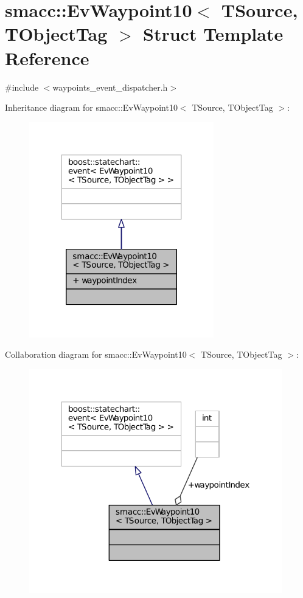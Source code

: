 \hypertarget{structsmacc_1_1EvWaypoint10}{}\section{smacc\+:\+:Ev\+Waypoint10$<$ T\+Source, T\+Object\+Tag $>$ Struct Template Reference}
\label{structsmacc_1_1EvWaypoint10}


{\ttfamily \#include $<$waypoints\+\_\+event\+\_\+dispatcher.\+h$>$}



Inheritance diagram for smacc\+:\+:Ev\+Waypoint10$<$ T\+Source, T\+Object\+Tag $>$\+:
\nopagebreak
\begin{figure}[H]
\begin{center}
\leavevmode
\includegraphics[width=227pt]{structsmacc_1_1EvWaypoint10__inherit__graph}
\end{center}
\end{figure}


Collaboration diagram for smacc\+:\+:Ev\+Waypoint10$<$ T\+Source, T\+Object\+Tag $>$\+:
\nopagebreak
\begin{figure}[H]
\begin{center}
\leavevmode
\includegraphics[width=312pt]{structsmacc_1_1EvWaypoint10__coll__graph}
\end{center}
\end{figure}

